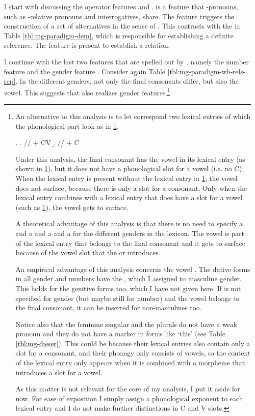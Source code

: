 I start with discussing the operator features  and .
 is a feature that -pronouns, such as -relative pronouns and interrogatives, share. The feature triggers the construction of a set of alternatives in the sense of \citet{rooth1985,rooth1992} \citep{hachem2015}. This contrasts with the  in Table \ref{tbl:mg-paradigm-dem}, which is responsible for establishing a definite reference.
The feature  is present to establish a relation.

I continue with the last two features that are spelled out by , namely the number feature  and the gender feature . Consider again Table \ref{tbl:mg-paradigm-wh-rels-rep}. In the different genders, not only the final consonants differ, but also the vowel. This suggests that  also realizes gender features.\footnote{
An alternative to this analysis is to let  correspond two lexical entries of which the phonological part look as in \ref{ex:wer-cv}.

\ex.\label{ex:wer-cv}
\a.\label{ex:w-cv} // + CV
\b.\label{ex:er-c} // + C

Under this analysis, the final consonant has the vowel  in its lexical entry (as shown in \ref{ex:er-c}), but it does not have a phonological slot for a vowel (i.e. no C). When the lexical entry is present without the lexical entry in \ref{ex:w-cv}, the vowel  does not surface, because there is only a slot for a consonant. Only when the lexical entry combines with a lexical entry that does have a slot for a vowel (such as \ref{ex:wer-cv}), the vowel  gets to surface.

A theoretical advantage of this analysis is that there is no need to specify a  and a  and a  and a  for the different genders in the lexicon. The vowel is part of the lexical entry that belongs to the final consonant and it gets to surface because of the vowel slot that the  or  introduces.

An empirical advantage of this analysis concerns the vowel . The dative forms in all gender and numbers have the , which I assigned to masculine gender. This holds for the genitive forms too, which I have not given here. If  is not specified for gender (but maybe still for number) and the vowel belongs to the final consonant, it can be inserted for non-masculines too.

Notice also that the feminine singular and the plurals do not have a weak pronoun and they do not have a marker in forms like  `this' (see Table \ref{tbl:mg-dieser}). This could be because their lexical entries also contain only a slot for a consonant, and their phonogy only consists of vowels, so the content of the lexical entry only appears when it is combined with a morpheme that introduces a slot for a vowel.

As this matter is not relevant for the core of my analysis, I put it aside for now. For ease of exposition I simply assign a phonological exponent to each lexical entry and I do not make further distinctions in C and V slots.
}

